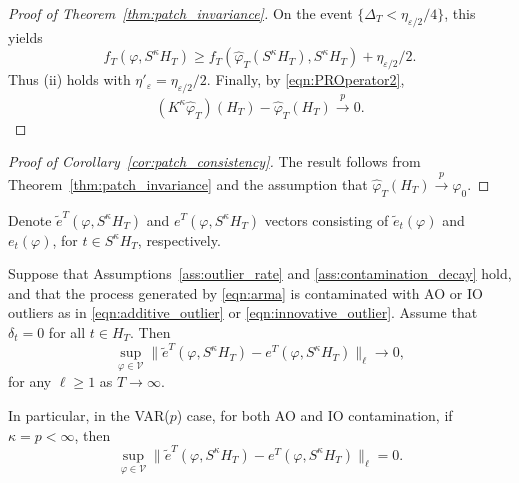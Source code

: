 \documentclass[12pt]{article}
\numberwithin{equation}{section}
\begin{document}
\begin{proof}[Proof of Theorem~\ref{thm:patch_invariance}]
On the event $\{\Delta_T<\eta_{\varepsilon/2}/4\}$, this yields
\begin{equation}
f_T(\varphi,S^\kappa H_T)
\ge
f_T(\hat{\varphi}_T(S^\kappa H_T),S^\kappa H_T)
+\eta_{\varepsilon/2}/2.
\end{equation}
Thus (ii) holds with $\eta'_\varepsilon=\eta_{\varepsilon/2}/2$.
Finally, by \eqref{eqn:PROperator2},
\begin{equation}
(K^\kappa\hat{\varphi}_T)(H_T)-\hat{\varphi}_T(H_T)
\overset{p}{\longrightarrow}0.
\end{equation}
\end{proof}


\begin{proof}[Proof of Corollary~\ref{cor:patch_consistency}]
The result follows from Theorem~\ref{thm:patch_invariance} and the assumption that $\hat{\varphi}_T(H_T)\overset{p}{\longrightarrow}\varphi_0$.
\end{proof}


Denote $\tilde{e}^T(\varphi, S^\kappa H_T)$ and $e^T(\varphi, S^\kappa H_T)$
vectors consisting of $\tilde{e}_{t}(\varphi)$ and $e_{t}(\varphi)$,
for $t \in S^\kappa H_T$, respectively.

\begin{lemma}\label{lem:residualconv_uniform}
Suppose that Assumptions~\ref{ass:outlier_rate} and \ref{ass:contamination_decay} hold, and that the process generated by \eqref{eqn:arma} is contaminated with AO or IO outliers as in \eqref{eqn:additive_outlier} or \eqref{eqn:innovative_outlier}.
Assume that
$\delta_t = 0$ for all $t \in H_T$.
Then
\begin{equation}\label{eq:evectorconvergence}
\sup_{\varphi \in \mathcal V}
\|\tilde{e}^T(\varphi, S^\kappa H_T)-e^T(\varphi, S^\kappa H_T)\|_\ell
\longrightarrow 0,
\end{equation}
for any $\ell \ge 1$ as $T\to\infty$.

In particular, in the VAR($p$) case, for both AO and IO contamination, if $\kappa = p < \infty$, then
\begin{equation}
\sup_{\varphi \in \mathcal V}
\|\tilde{e}^T(\varphi, S^\kappa H_T)-e^T(\varphi, S^\kappa H_T)\|_\ell
= 0.
\end{equation}
\end{lemma}
\end{document}
